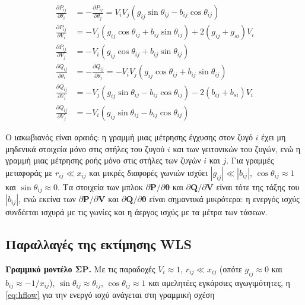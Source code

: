 \begin{align}
\frac{\partial P_{ij}}{\partial \theta_i} &= -\frac{\partial P_{ij}}{\partial \theta_j}
  = V_i V_j \left( g_{ij}\sin\theta_{ij} - b_{ij}\cos\theta_{ij} \right) \\
\frac{\partial P_{ij}}{\partial V_i} &= -V_j \left( g_{ij}\cos\theta_{ij} + b_{ij}\sin\theta_{ij} \right) + 2\left( g_{ij} + g_{si} \right) V_i \\
\frac{\partial P_{ij}}{\partial V_j} &= -V_i \left( g_{ij}\cos\theta_{ij} + b_{ij}\sin\theta_{ij} \right) \\
\frac{\partial Q_{ij}}{\partial \theta_i} &= -\frac{\partial Q_{ij}}{\partial \theta_j}
  = -V_i V_j \left( g_{ij}\cos\theta_{ij} + b_{ij}\sin\theta_{ij} \right) \\
\frac{\partial Q_{ij}}{\partial V_i} &= -V_j \left( g_{ij}\sin\theta_{ij} - b_{ij}\cos\theta_{ij} \right) - 2\left( b_{ij} + b_{si} \right) V_i \\
\frac{\partial Q_{ij}}{\partial V_j} &= -V_i \left( g_{ij}\sin\theta_{ij} - b_{ij}\cos\theta_{ij} \right)
\label{eq:jacflow}
\end{align}

Ο ιακωβιανός είναι αραιός: η γραμμή μιας μέτρησης έγχυσης στον ζυγό $i$ έχει μη μηδενικά
στοιχεία μόνο στις στήλες του ζυγού $i$ και των γειτονικών του ζυγών, ενώ η γραμμή μιας
μέτρησης ροής μόνο στις στήλες των ζυγών $i$ και $j$. Για γραμμές μεταφοράς με
$r_{ij} \ll x_{ij}$ και μικρές διαφορές γωνιών ισχύει $|g_{ij}| \ll |b_{ij}|$,
$\cos\theta_{ij} \approx 1$ και $\sin\theta_{ij} \approx 0$. Τα στοιχεία των μπλοκ
$\partial\mathbf{P}/\partial\boldsymbol{\theta}$ και $\partial\mathbf{Q}/\partial\mathbf{V}$
είναι τότε της τάξης του $|b_{ij}|$, ενώ εκείνα των $\partial\mathbf{P}/\partial\mathbf{V}$ και
$\partial\mathbf{Q}/\partial\boldsymbol{\theta}$ είναι σημαντικά μικρότερα: η ενεργός ισχύς
συνδέεται ισχυρά με τις γωνίες και η άεργος ισχύς με τα μέτρα των τάσεων.

\subsection{Παραλλαγές της εκτίμησης WLS}

\textbf{Γραμμικό μοντέλο ΣΡ.} Με τις παραδοχές $V_i \approx 1$, $r_{ij} \ll x_{ij}$ (οπότε
$g_{ij} \approx 0$ και $b_{ij} \approx -1/x_{ij}$), $\sin\theta_{ij} \approx \theta_{ij}$,
$\cos\theta_{ij} \approx 1$ και αμελητέες εγκάρσιες αγωγιμότητες, η \eqref{eq:hflow} για την
ενεργό ισχύ ανάγεται στη γραμμική σχέση

